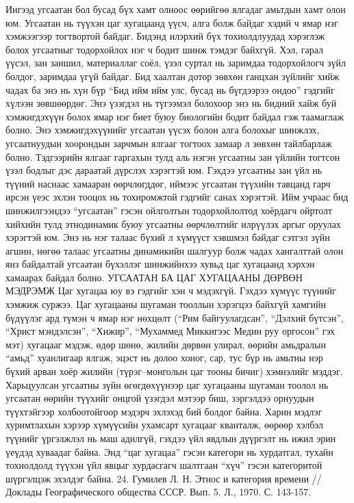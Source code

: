 Ингээд угсаатан бол бусад бүх хамт олноос өөрийгөө ялгадаг амьтдын хамт олон юм. Угсаатан нь түүхэн цаг хугацаанд үүсч, алга болж байдаг хэдий ч ямар нэг хэмжээгээр тогтвортой байдаг. Бидэнд илэрхий бүх тохиолдлуудад хэрэглэж болох угсаатныг тодорхойлох нэг ч бодит шинж тэмдэг байхгүй. Хэл, гарал үүсэл, зан заншил, материаллаг соёл, үзэл суртал нь заримдаа тодорхойлогч зүйл болдог, заримдаа үгүй байдаг. Бид хаалтан дотор зөвхөн ганцхан зүйлийг хийж чадах ба энэ нь хүн бүр “Бид ийм ийм улс, бусад нь бүгдээрээ ондоо” гэдгийг хүлээн зөвшөөрдөг. Энэ үзэгдэл нь түгээмэл болохоор энэ нь бидний хайж буй хэмжигдэхүүн болох ямар нэг биет буюу биологийн бодит байдал гэж таамаглаж болно. Энэ хэмжигдэхүүнийг угсаатан үүсэх болон алга болохыг шинжлэх, угсаатнуудын хоорондын зарчмын ялгааг тогтоох замаар л зөвхөн тайлбарлаж болно. Тэдгээрийн ялгааг гаргахын тулд аль нэгэн угсаатны зан үйлийн тогтсон үзэл бодлыг дэс дараатай дүрслэх хэрэгтэй юм. Гэхдээ угсаатны зан үйл нь түүний наснаас хамааран өөрчлөгддөг, иймээс угсаатан түүхийн тавцанд гарч ирсэн үеэс эхлэн тооцох нь тохиромжтой гэдгийг санах хэрэгтэй. Ийм учраас бид шинжилгээндээ “угсаатан” гэсэн ойлголтын тодорхойлолтод хоёрдагч ойртолт хийхийн тулд этнодинамик буюу угсаатны өөрчлөлтийг илрүүлэх аргыг оруулах хэрэгтэй юм. Энэ нь нэг талаас бүхий л хүмүүст хэвшмэл байдаг сэтгэл зүйн агшин, нөгөө талаас угсаатны динамикийн шалгуур болж чадах хангалттай олон янз байдалтай угсаатан бүхэллэг шинжийнхээ хувьд цаг хугацаанд хэрхэн хамаарах байдал болно.
УГСААТАН БА ЦАГ ХУГАЦААНЫ ДӨРВӨН МЭДРЭМЖ
Цаг хугацаа юу вэ гэдгийг хэн ч мэдэхгүй. Гэхдээ хүмүүс түүнийг хэмжиж суржээ. Цаг хугацааны шугаман тооллын хэрэгцээ байхгүй хамгийн бүдүүлэг ард түмэн ч ямар нэг нөхцөлт (“Рим байгуулагдсан”, “Дэлхий бүтсэн”, “Христ мэндэлсэн”, “Хижир”, “Мухаммед Миккигээс Медин руу оргосон” гэх мэт) хугацааг мэдэж, өдөр шөнө, жилийн дөрвөн улирал, өөрийн амьдралын “амьд” хуанлигаар ялгаж, эцэст нь долоо хоног, сар, тус бүр нь амьтны нэр бүхий арван хоёр жилийн (түрэг–монголын цаг тооны бичиг) хэмнэлийг мэддэг. Харьцуулсан угсаатны зүйн өгөгдөхүүнээр цаг хугацааны шугаман тоолол нь угсаатан өөрийн түүхийг онцгой үзэгдэл мэтээр биш, зэргэлдээ орнуудын түүхтэйгээр холбоотойгоор мэдэрч эхлэхэд бий болдог байна. Харин мэдлэг хуримтлахын хэрээр хүмүүсийн ухамсарт хугацааг кванталж, өөрөөр хэлбэл түүнийг үргэлжлэл нь маш адилгүй, гэхдээ үйл явдлын дүүргэлт нь ижил эрин үеүдэд хуваадаг байна. Энд “цаг хугацаа” гэсэн категори нь хурдатгал, тухайн тохиолдолд түүхэн үйл явцыг хурдасгагч шалтгаан “хүч” гэсэн категоритой шүргэлцэж эхэлдэг байна. 24. Гумилев Л. Н. Этнос и категория времени //Доклады Географического общества СССР. Вып. 5. Л., 1970. С. 143-157.
